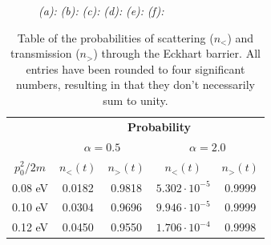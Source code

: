 \begin{figure}

\centering
\begin{subfigure}[t]{0.47\textwidth}
	\caption{}
	\label{fig:3_a}
\end{subfigure}
\begin{subfigure}[t]{0.47\textwidth}
	\caption{}
	\label{fig:3_b}
\end{subfigure}

\begin{subfigure}[t]{0.47\textwidth}
	\caption{}
	\label{fig:3_c}
\end{subfigure}
\begin{subfigure}[t]{0.47\textwidth}
	\caption{}
	\label{fig:3_d}
\end{subfigure}

\begin{subfigure}[t]{0.47\textwidth}
	\caption{}
	\label{fig:3_e}
\end{subfigure}
\begin{subfigure}[t]{0.47\textwidth}
	\caption{}
	\label{fig:3_f}
\end{subfigure}

\caption{
	\textit{(a):} 
	\textit{(b):} 
	\textit{(c):} 
	\textit{(d):} 
	\textit{(e):} 
	\textit{(f):} 
}
\label{fig:3}
\end{figure}

\begin{table}
	\centering
	\caption{Table of the probabilities of scattering ($n_<$) and transmission ($n_>$) through the Eckhart barrier. All entries have been rounded to four significant numbers, resulting in that they don't necessarily sum to unity.}
	\begin{tabular}{c|cc|cc}
					& \multicolumn{4}{c}{\textbf{Probability}} \\
					& \multicolumn{2}{c|}{$\alpha = 0.5$} & \multicolumn{2}{c}{$\alpha = 2.0$} \\
		$p_0^2/2m$	& $n_<(t)$	& $n_>(t)$	& $n_<(t)$	& $n_>(t)$	\\ \hline
		0.08 eV		& 0.0182	& 0.9818	& $5.302 \cdot 10^{-5}$	& 0.9999	\\
		0.10 eV		& 0.0304	& 0.9696	& $9.946 \cdot 10^{-5}$	& 0.9999	\\
		0.12 eV		& 0.0450	& 0.9550	& $1.706 \cdot 10^{-4}$	& 0.9998
	\end{tabular}
	\label{tab:3}
\end{table}

